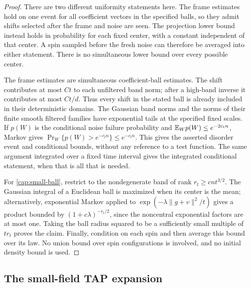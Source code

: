 \begin{proof}
There are two different uniformity statements here. The frame estimates
hold on one event for all coefficient vectors in the specified balls, so
they admit shifts selected after the frame and noise are seen. The
projection lower bound instead holds in probability for each fixed center,
with a constant independent of that center. A spin sampled before the
fresh noise can therefore be averaged into either statement. There is no
simultaneous lower bound over every possible center.

The frame estimates are simultaneous coefficient-ball estimates. The shift
contributes at most $Ct$ to each unfiltered band norm; after a high-band
inverse it contributes at most $Ct/d$. Thus every shift in the stated ball is
already included in their deterministic domains. The Gaussian band norms and
the norms of their finite smooth filtered families have exponential tails at
the specified fixed scales. If \(p(W)\) is the conditional noise failure
probability and \(\mathbb E_Wp(W)\le e^{-2c_tn}\), Markov gives
\(\Pr_W\{p(W)>e^{-c_tn}\}\le e^{-c_tn}\). This gives the asserted disorder
event and conditional bounds, without any reference to a test function.
The same argument integrated over a fixed time interval gives
the integrated conditional statement, when that is all that is needed.

For \eqref{cap:small-ball}, restrict to the nondegenerate band of rank $r_t\ge
cnt^{3/2}$. The Gaussian integral of a Euclidean ball is maximized when its
center is the mean; alternatively, exponential Markov applied to
$\exp(-\lambda\|g+v\|^2/t)$ gives a product bounded by
$(1+c\lambda)^{-r_t/2}$, since the noncentral exponential factors are at most
one. Taking the ball radius squared to be a sufficiently small multiple of
$tr_t$ proves the claim. Finally, condition on each spin and then average this
bound over its law. No union bound over spin configurations is involved, and
no initial density bound is used. \end{proof}

\subsection{The small-field TAP expansion}

